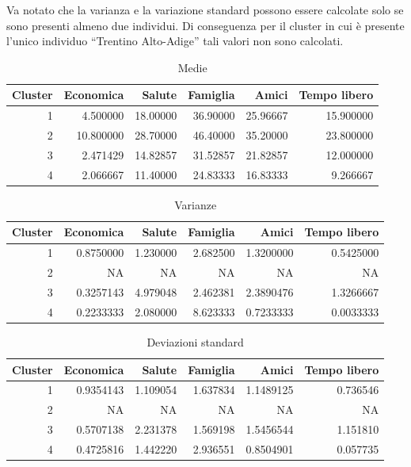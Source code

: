 \documentclass[]{book}
\begin{document}
Va notato che la varianza e la variazione standard possono essere
calcolate solo se sono presenti almeno due individui. Di conseguenza per
il cluster in cui è presente l'unico individuo ``Trentino Alto-Adige''
tali valori non sono calcolati.

\begin{table}

\caption{\label{tab:misure-sintesi-medie}Medie}
\centering
\begin{tabular}[t]{r|r|r|r|r|r}
\hline
Cluster & Economica & Salute & Famiglia & Amici & Tempo libero\\
\hline
1 & 4.500000 & 18.00000 & 36.90000 & 25.96667 & 15.900000\\
\hline
2 & 10.800000 & 28.70000 & 46.40000 & 35.20000 & 23.800000\\
\hline
3 & 2.471429 & 14.82857 & 31.52857 & 21.82857 & 12.000000\\
\hline
4 & 2.066667 & 11.40000 & 24.83333 & 16.83333 & 9.266667\\
\hline
\end{tabular}
\end{table}

\begin{table}

\caption{\label{tab:misure-sintesi-varianze}Varianze}
\centering
\begin{tabular}[t]{r|r|r|r|r|r}
\hline
Cluster & Economica & Salute & Famiglia & Amici & Tempo libero\\
\hline
1 & 0.8750000 & 1.230000 & 2.682500 & 1.3200000 & 0.5425000\\
\hline
2 & NA & NA & NA & NA & NA\\
\hline
3 & 0.3257143 & 4.979048 & 2.462381 & 2.3890476 & 1.3266667\\
\hline
4 & 0.2233333 & 2.080000 & 8.623333 & 0.7233333 & 0.0033333\\
\hline
\end{tabular}
\end{table}

\begin{table}

\caption{\label{tab:misure-sintesi-sd}Deviazioni standard}
\centering
\begin{tabular}[t]{r|r|r|r|r|r}
\hline
Cluster & Economica & Salute & Famiglia & Amici & Tempo libero\\
\hline
1 & 0.9354143 & 1.109054 & 1.637834 & 1.1489125 & 0.736546\\
\hline
2 & NA & NA & NA & NA & NA\\
\hline
3 & 0.5707138 & 2.231378 & 1.569198 & 1.5456544 & 1.151810\\
\hline
4 & 0.4725816 & 1.442220 & 2.936551 & 0.8504901 & 0.057735\\
\hline
\end{tabular}
\end{table}
\end{document}
